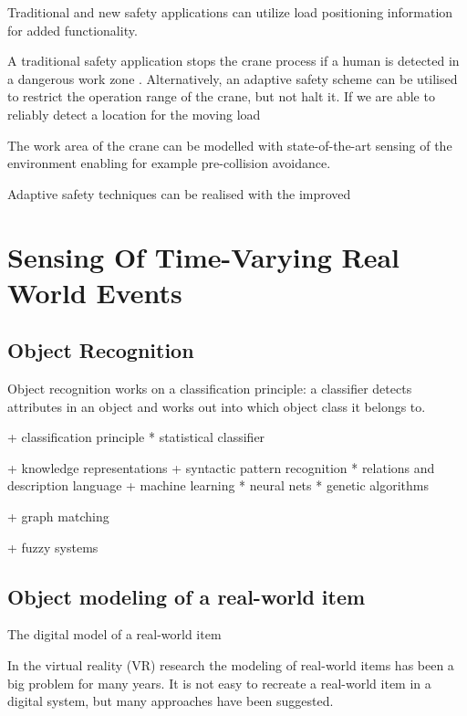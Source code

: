 \documentclass[12pt,a4paper,oneside,pdftex]{report}
\begin{document}
Traditional and new safety applications can utilize load positioning information for added functionality.

A traditional safety application stops the crane process if a human is detected in a dangerous work zone \cite{Raula11}. Alternatively, an adaptive safety scheme can be utilised to restrict the operation range of the crane, but not halt it. If we are able to reliably detect a location for the moving load

The work area of the crane can be modelled with state-of-the-art sensing of the environment enabling for example pre-collision avoidance.

Adaptive safety techniques can be realised with the improved

\chapter{Sensing Of Time-Varying Real World Events}

\section{Object Recognition}

Object recognition works on a classification principle: a classifier detects attributes in an object and works out into which object class it belongs to.

+ classification principle
    * statistical classifier
    
+ knowledge representations
    + syntactic pattern recognition
        * relations and description language
+ machine learning
    * neural nets
    * genetic algorithms
    
+ graph matching

+ fuzzy systems


\subsection{}



\section{Object modeling of a real-world item}

The digital model of a real-world item

In the virtual reality (VR) research the modeling of real-world items has been a big problem for many years. 
It is not easy to recreate a real-world item in a digital system, but many approaches have been suggested.
\end{document}
